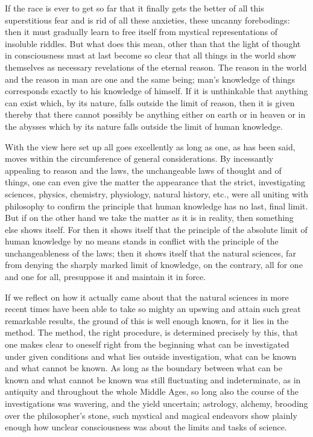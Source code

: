 \documentclass[12pt,a4paper,openany]{book}
\newcommand{\opage}[1]{\marginnote{\footnotesize\textit{[#1]}}}
\begin{document}
If the race is ever to get so far that it finally
gets the better of all this superstitious fear and
is rid of all these anxieties, these uncanny forebodings:
then it must gradually learn to free itself
from mystical representations of insoluble riddles. But
what does this mean, other than that the light of thought in
consciousness must at last become so clear that all things
in the world show themselves as necessary revelations of the
eternal reason. The reason in the world and the reason in man
are one and the same being; man's knowledge of
things corresponds exactly to his knowledge of himself. If
it is unthinkable that anything can exist which, by its
nature, falls outside the limit of reason, then it is given thereby
that there cannot possibly be anything either on earth or in heaven
or in the abysses which by its nature falls outside the limit of human knowledge.

With the view here set up all goes excellently
as long as one, as has been said, moves within
the circumference of general considerations. By incessantly
appealing to reason and the laws, the unchangeable laws
of thought and of things, one can even give
the matter the appearance that the strict, investigating sciences,
physics, chemistry, physiology, natural history, etc.,  %
were all uniting with philosophy to confirm the
principle that human knowledge has no
last, final limit. But if on the other hand we take the matter as
\setcounter{footnote}{0}%
\opage{393}it is in reality, then something else shows itself.
For then it shows itself that the principle of the absolute limit
of human knowledge by no means stands in
conflict with the principle of the unchangeableness of the laws;
then it shows itself that the natural sciences, far from
denying the sharply marked limit of knowledge, on the contrary,
all for one and one for all, presuppose it and maintain it
in force.

If we reflect on how it actually came about
that the natural sciences in more recent times have been able to
take so mighty an upswing and attain such great remarkable
results, the ground of this is well enough known,
for it lies in the method. The method, the right procedure,
is determined precisely by this, that one makes clear to oneself
right from the beginning what can be investigated under given
conditions and what lies outside
investigation, what can be known and what cannot
be known. As long as the boundary between what can be
known and what cannot be known was still fluctuating
and indeterminate, as in antiquity and throughout the whole
Middle Ages, so long also the course of the investigations
was wavering, and the yield uncertain; astrology,
alchemy, brooding over the philosopher's stone, such mystical
and magical endeavors show plainly enough how
unclear consciousness was about the limits and
tasks of science.
\end{document}
